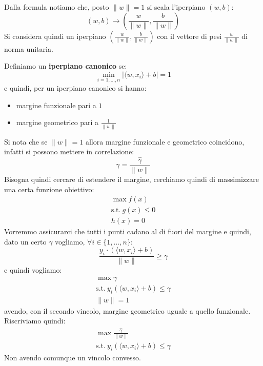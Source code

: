 Dalla formula notiamo che, posto $\| w \| = 1$ si scala l'iperpiano $(w, b)$:
\begin{equation}
    (w, b) \to \left(\frac{w}{\|w\|}, \frac{b}{\| w\|}\right)
\end{equation}
Si considera quindi un iperpiano $\left(\frac{w}{\|w\|}, \frac{b}{\| w\|}\right)$
con il vettore di pesi $\frac{w}{\| w \|}$ di norma unitaria.
\begin{definizione}
    Definiamo un \textbf{iperpiano canonico} se:
    \begin{equation}
        \min_{i = 1, \dots, n} |\langle w, x_i \rangle + b| =  1
    \end{equation}
    e quindi, per un iperpiano canonico si hanno:
    \begin{itemize}
        \item margine funzionale pari a $1$
        \item margine geometrico pari a $\frac{1}{\| w \|}$
    \end{itemize}
\end{definizione}
Si nota che se $\| w \| = 1$ allora margine funzionale e geometrico coincidono,
infatti si possono mettere in correlazione:
\begin{equation}
    \gamma = \frac{\hat{\gamma}}{\| w \|}
\end{equation}
Bisogna quindi cercare di estendere il margine, cerchiamo quindi di massimizzare
una certa funzione obiettivo:
\begin{equation*}
    \begin{aligned}
        \max f(x) \\ \text{s.t.} \ g(x) \leq 0 \\ h(x) = 0
    \end{aligned}
\end{equation*}
Vorremmo assicurarci che tutti i punti cadano al di fuori del margine e quindi,
dato un certo $\gamma$ vogliamo, $\forall i \in \{1, \dots, n\}$:
\begin{equation}
    \frac{y_i \cdot (\langle w, x_i \rangle + b)}{\| w \|} \geq \gamma
\end{equation}
e quindi vogliamo:
\begin{equation*}
    \begin{aligned}
        \max \gamma \\ \text{s.t.} \ y_i (\langle w, x_i \rangle + b) \leq
        \gamma      \\ \| w \| = 1
    \end{aligned}
\end{equation*}
avendo, con il secondo vincolo, margine geometrico uguale a quello funzionale.
Riscriviamo quindi:
\begin{equation*}
    \begin{aligned}
        \max \frac{\hat{\gamma}}{\|w\|} \\ \text{s.t.} \ y_i(\langle w, x_i
        \rangle + b) \leq \gamma
    \end{aligned}
\end{equation*}
Non avendo comunque un vincolo convesso.

